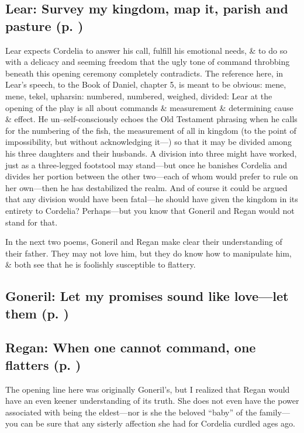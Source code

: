 \subsection{Lear: Survey my kingdom, map it, parish and pasture (p. \pageref{ch:lear_ac})}
Lear expects Cordelia to answer his call, fulfill his emotional needs, \& to do so with a delicacy and seeming freedom that the ugly tone of command throbbing beneath this opening ceremony completely contradicts. The reference here, in Lear's speech, to the Book of Daniel, chapter 5, is meant to be obvious: mene, mene, tekel, upharsin: numbered, numbered, weighed, divided: Lear at the opening of the play is all about commands \& measurement \& determining cause \& effect. He un--self-consciously echoes the Old Testament phrasing when he calls for the numbering of the fish, the measurement of all in kingdom (to the point of impossibility, but without acknowledging it---) so that it may be divided among his three daughters and their husbands. A division into three might have worked, just as a three-legged footstool may stand---but once he banishes Cordelia and divides her portion between the other two---each of whom would prefer to rule on her own---then he has destabilized the realm. And of course it could be argued that any division would have been fatal---he should have given the kingdom in its entirety to Cordelia? Perhaps---but you know that Goneril and Regan would not stand for that.

In the next two poems, Goneril and Regan make clear their understanding of their father. They may not love him, but they do know how to manipulate him, \& both see that he is foolishly susceptible to flattery.

\subsection{Goneril: Let my promises sound like love---let them (p. \pageref{ch:lear_ad})}

\subsection{Regan: When one cannot command, one flatters (p. \pageref{ch:lear_ae})}

The opening line here was originally Goneril's, but I realized that Regan would have an even keener understanding of its truth. She does not even have the power associated with being the eldest---nor is she the beloved ``baby'' of the family---you can be sure that any sisterly affection she had for Cordelia curdled ages ago.


